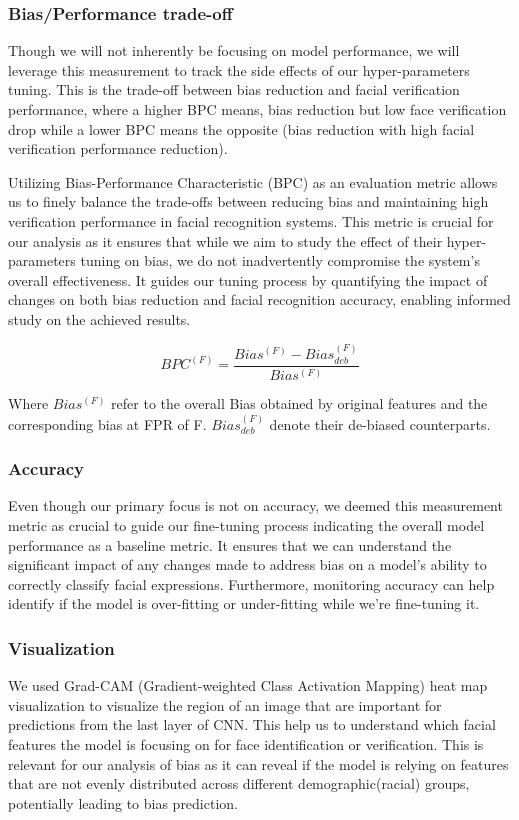 \documentclass[conference]{IEEEtran}
\begin{document}
\subsubsection{Bias/Performance trade-off}
Though we will not inherently be focusing on model performance, we will leverage this measurement to track the side effects of our hyper-parameters tuning.
This is the trade-off between bias reduction and facial verification performance, where a higher BPC means, bias reduction but low face verification drop while a lower BPC means the opposite (bias reduction with high facial verification performance reduction).

Utilizing Bias-Performance Characteristic (BPC) as an evaluation metric allows us to finely balance the trade-offs between reducing bias and maintaining high verification performance in facial recognition systems. This metric is crucial for our analysis as it ensures that while we aim to study the effect of their hyper-parameters tuning on bias, we do not inadvertently compromise the system's overall effectiveness. It guides our tuning process by quantifying the impact of changes on both bias reduction and facial recognition accuracy, enabling informed study on the achieved results.

\begin{equation}
    {BPC^{(F)}=\frac{Bias^{(F)}-Bias_{deb}^{(F)}}{Bias^{(F)}}}
\end{equation}

Where $Bias^{(F)}$ refer to the overall Bias obtained by original features and the corresponding bias at FPR of F. $Bias_{deb}^{(F)}$ denote their de-biased counterparts. 

\subsubsection{Accuracy}
Even though our primary focus is not on accuracy, we deemed this measurement metric as crucial to guide our fine-tuning process indicating the overall model performance as a baseline metric. It ensures that we can understand the significant impact of any changes made to address bias on a model's ability to correctly classify facial expressions.
Furthermore, monitoring accuracy can help identify if the model is over-fitting or under-fitting while we’re fine-tuning it.

\subsubsection{Visualization}
We used Grad-CAM (Gradient-weighted Class Activation Mapping) heat map visualization to visualize the region of an image that are important for predictions from the last layer of CNN. This help us to understand which facial features the model is focusing on for face identification or verification. This is relevant for our analysis of bias as it can reveal if the model is relying on features that are not evenly distributed across different demographic(racial) groups, potentially leading to bias prediction.
\end{document}
